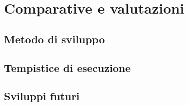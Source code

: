 \chapter{Comparative e valutazioni}

\section{Metodo di sviluppo}
\section{Tempistice di esecuzione}
\section{Sviluppi futuri}
